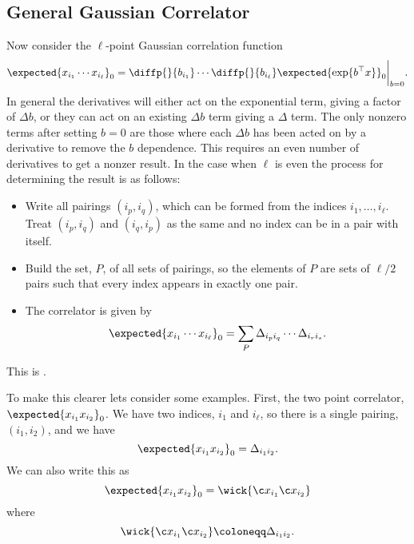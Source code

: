 \documentclass[fleqn]{NotesClass}
\newcommand{\trans}{{\top}}
\begin{document}
    \subsection{General Gaussian Correlator}
    Now consider the \(\ell\)-point Gaussian correlation function
    \begin{equation}
        \expected{x_{i_1} \dotsm x_{i_\ell}}_0 = \diffp{}{b_{i_1}} \dotsm \diffp{}{b_{i_\ell}} \expected{\exp\{b^\trans x\}}_0 \bigg|_{b = 0}.
    \end{equation}
    In general the derivatives will either act on the exponential term, giving a factor of \(\Delta b\), or they can act on an existing \(\Delta b\) term giving a \(\Delta\) term.
    The only nonzero terms after setting \(b = 0\) are those where each \(\Delta b\) has been acted on by a derivative to remove the \(b\) dependence.
    This requires an even number of derivatives to get a nonzer result.
    In the case when \(\ell\) is even the process for determining the result is as follows:
    \begin{itemize}
        \item Write all pairings \((i_p, i_q)\), which can be formed from the indices \(i_1, \dotsc, i_\ell\).
        Treat \((i_p, i_q)\) and \((i_q, i_p)\) as the same and no index can be in a pair with itself.
        \item Build the set, \(P\), of all sets of pairings, so the elements of \(P\) are sets of \(\ell/2\) pairs such that every index appears in exactly one pair.
        \item The correlator is given by
        \begin{equation}
            \expected{x_{i_1}\dotsm x_{i_\ell}}_0 = \sum_{P} \Delta_{i_p i_q} \dotsm \Delta_{i_ri_s}.
        \end{equation}
    \end{itemize}
    This is .
    
    To make this clearer lets consider some examples.
    First, the two point correlator, \(\expected{x_{i_1}x_{i_2}}_0\).
    We have two indices, \(i_1\) and \(i_\ell\), so there is a single pairing, \((i_1, i_2)\), and we have
    \begin{equation}
        \expected{x_{i_1}x_{i_2}}_0 = \Delta_{i_1i_2}.
    \end{equation}
    We can also write this as
    \begin{equation}
        \expected{x_{i_1}x_{i_2}}_0 = \wick{\c x_{i_1} \c x_{i_2}}
    \end{equation}
    where
    \begin{equation}
        \wick{\c x_{i_1} \c x_{i_2}} \coloneqq \Delta_{i_1i_2}.
    \end{equation}
    
\end{document}
